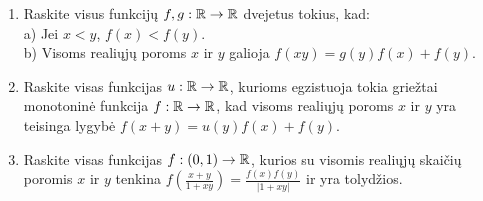 \begin{enumerate}
  \item Raskite visus funkcijų  $f,g:\mathbb R\rightarrow\mathbb R$ dvejetus tokius,
    kad:\\
    a) Jei $x<y$, $f(x)<f(y)$.\\
    b) Visoms realiųjų poroms $x$ ir $y$ galioja $f(xy)=g(y)f(x)+f(y)$.
  \item Raskite visas funkcijas  $u:\mathbb R\to\mathbb R$, kurioms egzistuoja tokia
    griežtai monotoninė funkcija $f:\mathbb R\to\mathbb R$, kad visoms realiųjų poroms
    $x$ ir $y$ yra teisinga lygybė $f(x+y)=u(y)f(x)+f(y)$.
  \item Raskite visas funkcijas $f:(0,1)\rightarrow\mathbb R$, kurios su visomis
    realiųjų skaičių poromis $x$ ir $y$ tenkina
    $f(\frac{x+y}{1+xy})=\frac{f(x)f(y)}{|1+xy|}$ ir yra tolydžios.

\end{enumerate}

